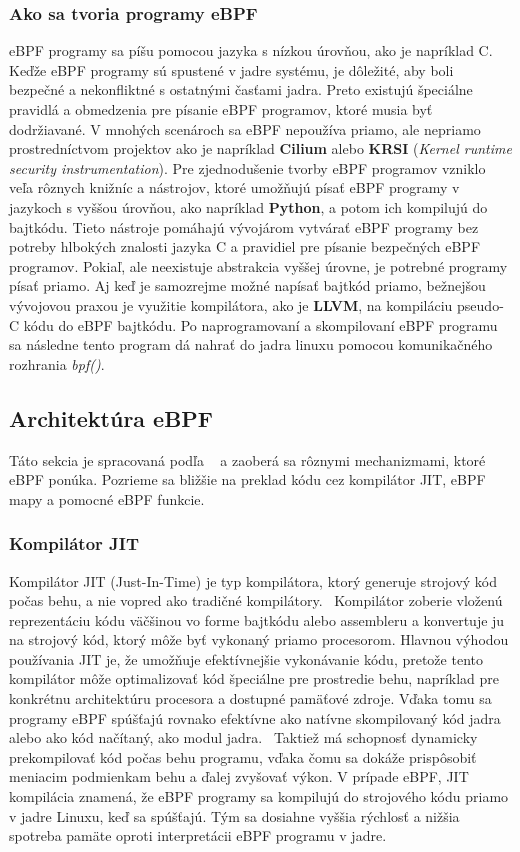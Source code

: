 \subsubsection{Ako sa tvoria programy eBPF}
eBPF programy sa píšu pomocou jazyka s nízkou úrovňou, ako je napríklad C. Keďže eBPF programy sú spustené v jadre systému, je dôležité, 
aby boli bezpečné a nekonfliktné s ostatnými časťami jadra. Preto existujú špeciálne pravidlá a obmedzenia pre písanie eBPF programov, 
ktoré musia byť dodržiavané. V mnohých scenároch sa eBPF nepoužíva priamo, ale nepriamo prostredníctvom projektov ako je napríklad 
\textbf{Cilium} alebo \textbf{KRSI} (\emph{Kernel runtime security instrumentation}). Pre zjednodušenie tvorby eBPF programov vzniklo veľa rôznych 
knižníc a nástrojov, ktoré umožňujú písať eBPF programy v jazykoch s vyššou úrovňou, ako napríklad \textbf{Python}, a potom ich kompilujú do bajtkódu. 
Tieto nástroje pomáhajú vývojárom vytvárať eBPF programy bez potreby hlbokých znalosti jazyka C a pravidiel pre písanie bezpečných eBPF programov. 
Pokiaľ, ale neexistuje abstrakcia vyššej úrovne, je potrebné programy písať priamo. Aj keď je samozrejme možné napísať bajtkód priamo, 
bežnejšou vývojovou praxou je využitie kompilátora, ako je \textbf{LLVM}, na kompiláciu pseudo-C kódu do eBPF bajtkódu. 
Po naprogramovaní a skompilovaní eBPF programu sa následne tento program dá nahrať do jadra linuxu pomocou komunikačného rozhrania \emph{bpf()}.

\subsection{Architektúra eBPF}
\label{sec:architecture}
Táto sekcia je spracovaná podľa ~\cite{eBPF,bpf-doc,book1} a zaoberá sa rôznymi mechanizmami, ktoré eBPF ponúka. 
Pozrieme sa bližšie na preklad kódu cez kompilátor JIT, eBPF mapy a pomocné eBPF funkcie.

\subsubsection{Kompilátor JIT}
Kompilátor JIT (Just-In-Time) je typ kompilátora, ktorý generuje strojový kód počas behu, a nie vopred ako tradičné kompilátory.~\cite{eBPF}
Kompilátor zoberie vloženú reprezentáciu kódu  väčšinou vo forme bajtkódu alebo assembleru a konvertuje ju na strojový kód, ktorý môže byť vykonaný priamo procesorom. 
Hlavnou výhodou používania JIT je, že umožňuje efektívnejšie vykonávanie kódu, pretože tento kompilátor môže optimalizovať kód špeciálne pre prostredie behu, 
napríklad pre konkrétnu architektúru procesora a dostupné pamäťové zdroje. Vďaka tomu sa programy eBPF spúšťajú rovnako efektívne ako natívne skompilovaný 
kód jadra alebo ako kód načítaný, ako modul jadra.~\cite{eBPF} Taktiež má  schopnosť dynamicky prekompilovať kód počas behu programu, vďaka čomu sa dokáže prispôsobiť 
meniacim podmienkam behu a ďalej zvyšovať výkon. V prípade eBPF, JIT kompilácia znamená, že eBPF programy sa kompilujú do strojového kódu priamo v jadre Linuxu, 
keď sa spúšťajú. Tým sa dosiahne vyššia rýchlosť a nižšia spotreba pamäte oproti interpretácii eBPF programu v jadre.

